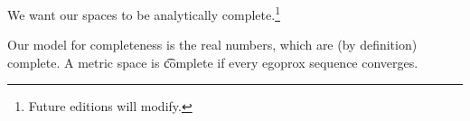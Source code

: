 

We want our spaces to be analytically complete.\footnote{Future editions will modify.}


Our model for completeness is the real numbers, which are (by definition) complete.
A metric space is \t{complete} if every egoprox sequence converges.

\blankpage

